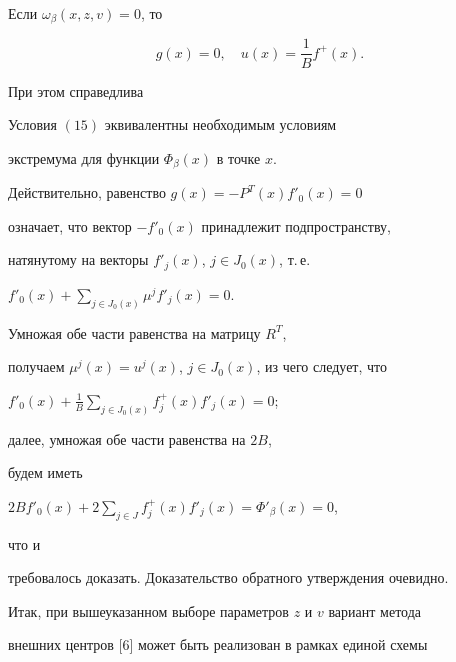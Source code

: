 Если $\omega_\beta(x,z,v)=0$, то 


\begin{equation} 


g(x)=0,\quad u(x)=\frac{1}{B}f^+(x). 


\end{equation} 


 


При этом справедлива


 


\begin{lem} Условия $(15)$ эквивалентны необходимым условиям 


экстремума для функции $\Phi_\beta(x)$ в точке $x$. 


\end{lem} 


 


\begin{pf} Действительно, равенство $g(x)=-P^T(x)f'_0(x)=0$ 


означает, что вектор $-f'_0(x)$ принадлежит подпространству, 


натянутому на векторы $f'_j(x)$, $j\in J_0(x)$, т.\,е.\linebreak


$f'_0(x)+\sum\limits_{j\in J_0(x)}\mu^j f'_j(x)=0$. 


Умножая обе части равенства на матрицу $R^T$, 


получаем $\mu^j(x)=u^j(x)$, $j\in J_0(x)$, из чего следует, что 


$f'_0(x)+\frac{1}{B}\sum\limits_{j\in J_0(x)}f^+_j(x)f'_j(x)=0$; 


далее, умножая обе части равенства на $2B$, 


будем иметь 


$2B f'_0(x)+2\sum\limits_{j\in J}f^+_j(x)f'_j(x)=\Phi'_\beta(x)=0$, 


что и 


требовалось доказать. Доказательство обратного утверждения очевидно. 


\end{pf} 


 


Итак, при вышеуказанном выборе параметров $z$ и $v$ вариант метода 


внешних центров [6] может быть реализован в рамках единой схемы 



